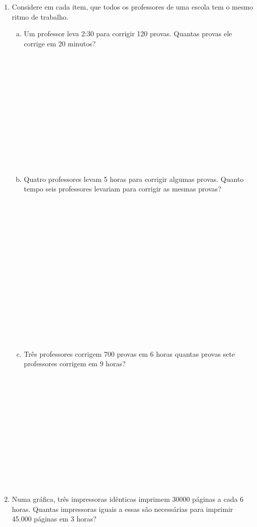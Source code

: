 \documentclass[a4paper,14pt]{article}
\begin{document}
\begin{multicols}{2}
\begin{enumerate}
            \item Considere em cada item, que todos os professores de uma escola tem o mesmo ritmo de trabalho.
            \begin{enumerate}[a)]
            	\item Um professor leva 2:30 para corrigir 120 provas. Quantas provas ele corrige em 20 minutos? \\\\\\\\\\\\\\\\\\\\\\\\\\
            	\item Quatro professores levam 5 horas para corrigir algumas provas. Quanto tempo seis professores levariam para corrigir as mesmas provas? \\\\\\\\\\\\\\\\\\\\\\\\\\\\\\\\
            	\item Três professores corrigem 700 provas em 6 horas quantas provas sete professores corrigem em 9 horas? \\\\\\\\\\\\\\\\\\\\\\\\\\
            \end{enumerate}
            \item Numa gráfica, três impressoras idênticas imprimem 30000 páginas a cada 6 horas. Quantas impressoras iguais a essas são necessárias para imprimir 45.000 páginas em 3 horas?

\end{enumerate}
\end{multicols}
\end{document}
